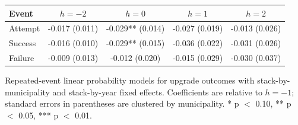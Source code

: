 \begin{center}
\scriptsize
\begin{tabular}{lcccc}
\toprule
Event & $h=-2$ & $h=0$ & $h=1$ & $h=2$ \\
\midrule
Attempt & -0.017 (0.011) & -0.029** (0.014) & -0.027 (0.019) & -0.013 (0.026) \\
Success & -0.016 (0.010) & -0.029** (0.015) & -0.036 (0.022) & -0.031 (0.026) \\
Failure & -0.009 (0.013) & -0.012 (0.020) & -0.015 (0.029) & -0.030 (0.037) \\
\bottomrule
\end{tabular}
\vspace{0.05cm}
\parbox{0.94\textwidth}{\tiny Repeated-event linear probability models for upgrade outcomes with stack-by-municipality and stack-by-year fixed effects. Coefficients are relative to $h=-1$; standard errors in parentheses are clustered by municipality. * p $<$ 0.10, ** p $<$ 0.05, *** p $<$ 0.01.}
\end{center}
